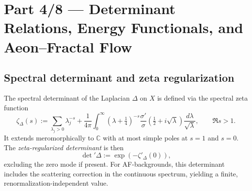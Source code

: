 

\section*{Part 4/8 — Determinant Relations, Energy Functionals, and Aeon–Fractal Flow}
\relax\hspace{0pt}

\subsection{Spectral determinant and zeta regularization}
\label{subsec:determinant}
\relax\hspace{0pt}

The spectral determinant of the Laplacian $\Delta$ on $X$ is defined via
the spectral zeta function
\[
\zeta_\Delta(s)
:= \sum_{\lambda_j>0}\lambda_j^{-s}
+\frac{1}{4\pi}\int_0^\infty
\left(\lambda+\tfrac14\right)^{-s}
\frac{\sigma'}{\sigma}\!\left(\tfrac12+i\sqrt{\lambda}\right)
\frac{d\lambda}{\sqrt{\lambda}},
\qquad \Re s>1.
\]
It extends meromorphically to $\mathbb{C}$ with at most simple poles at
$s=1$ and $s=0$. The \emph{zeta-regularized determinant} is then
\[
\det{}'\!\Delta
:= \exp\!\left(-\zeta'_\Delta(0)\right),
\]
excluding the zero mode if present. For AF-backgrounds, this determinant
includes the scattering correction in the continuous spectrum, yielding
a finite, renormalization-independent value.                             %

